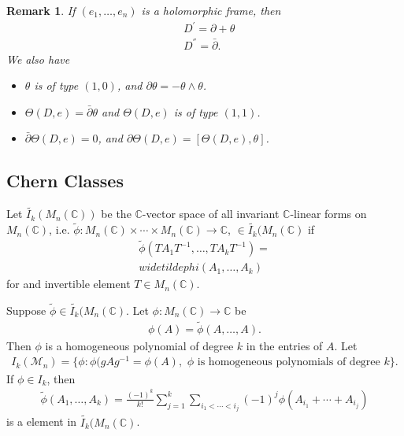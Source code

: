 \documentclass[a4paper,10pt]{amsart}
\newtheorem{remark}{Remark}[section]
\newcommand{\C}{\mathbb C} %
\newcommand{\M}{\mathcal M} %
\begin{document}
\begin{remark}
    If $(e_1, \ldots, e_n)$ is a holomorphic frame, then
    \begin{align*}
        & D^{'} = \partial + \theta\\
        & D^{''} = \bar{\partial}.   
    \end{align*}
    We also have
    \begin{itemize}
        \item $\theta$ is of type $(1,0)$, and 
            $\partial \theta = - \theta \wedge \theta$.
        \item $\Theta(D, e) = \bar{\partial}\theta$ and 
            $\Theta(D,e)$ is of type $(1,1)$.
        \item $\bar{\partial}\Theta(D,e) = 0$, and 
            $\partial \Theta(D,e) = [\Theta(D,e), \theta]$.
    \end{itemize}
\end{remark}

\subsection{Chern Classes}

Let $\widetilde{I_{k}}(M_{n}(\C))$ be the $\C$-vector space of all invariant
$\C$-linear forms on $M_{n}(\C)$, i.e. $\widetilde{\phi}
: M_{n}(\C) \times \cdots \times M_{n}(\C) \rightarrow \C$,  
$\in \widetilde{I_{k}}(M_{n}(\C)$ if
\begin{align*}
    \widetilde{\phi}(TA_{1}T^{-1}, \ldots, TA_{k}T^{-1}) = 
    \\widetilde{phi}(A_{1}, \ldots, A_{k})
\end{align*}
for and invertible element $T \in M_{n}(\C)$.

Suppose $\widetilde{\phi} \in \widetilde{I_{k}}(M_{n}(\C)$. Let
$\phi: M_{n}(\C) \rightarrow \C$ be
\begin{align*}
    \phi(A) = \widetilde{\phi}(A, \ldots, A). 
\end{align*}
Then $\phi$ is a homogeneous polynomial of degree $k$ in the
entries of $A$. Let 
\begin{align*}
    I_{k}(\M_{n}) = \{\phi : \phi(gAg^{-1} = \phi(A), \mbox{
    $\phi$ is homogeneous polynomials of degree $k$} \}.
\end{align*}
If $\phi \in I_{k}$, then
\begin{align*}
    \widetilde{\phi}(A_1, \ldots, A_{k}) = 
    \frac{(-1)^{k}}{k!} \sum^{k}_{j=1} \sum_{i_1 < \cdots < i_{j}}
    (-1)^{j}\phi(A_{i_1}+ \cdots + A_{i_j})
\end{align*}
is a element in $\widetilde{I_{k}}(M_{n}(\C)$.
\end{document}
